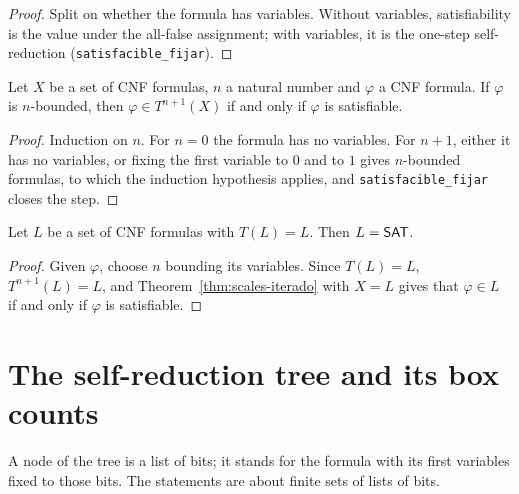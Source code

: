 \begin{proof}
  \leanok
  Split on whether the formula has variables. Without variables, satisfiability is the value under the
  all-false assignment; with variables, it is the one-step self-reduction (\texttt{satisfacible\_fijar}).
\end{proof}

\begin{theorem}
  \label{thm:scales-iterado}
  \leanok
  Let $X$ be a set of CNF formulas, $n$ a natural number and $\varphi$ a CNF formula. If $\varphi$ is
  $n$-bounded, then $\varphi \in T^{n+1}(X)$ if and only if $\varphi$ is satisfiable.
  \own{}
\end{theorem}

\begin{proof}
  \leanok
  Induction on $n$. For $n = 0$ the formula has no variables. For $n+1$, either it has no variables, or
  fixing the first variable to $0$ and to $1$ gives $n$-bounded formulas, to which the induction hypothesis
  applies, and \texttt{satisfacible\_fijar} closes the step.
\end{proof}

\begin{theorem}
  \label{thm:scales-punto-fijo-unico}
  \leanok
  Let $L$ be a set of CNF formulas with $T(L) = L$. Then $L = \mathsf{SAT}$.
  \own{}
\end{theorem}

\begin{proof}
  \leanok
  Given $\varphi$, choose $n$ bounding its variables. Since $T(L) = L$, $T^{n+1}(L) = L$, and
  Theorem~\ref{thm:scales-iterado} with $X = L$ gives that $\varphi \in L$ if and only if $\varphi$ is
  satisfiable.
\end{proof}

\section{The self-reduction tree and its box counts}
\label{sec:scales-arbol}

A node of the tree is a list of bits; it stands for the formula with its first variables fixed to those
bits. The statements are about finite sets of lists of bits.

